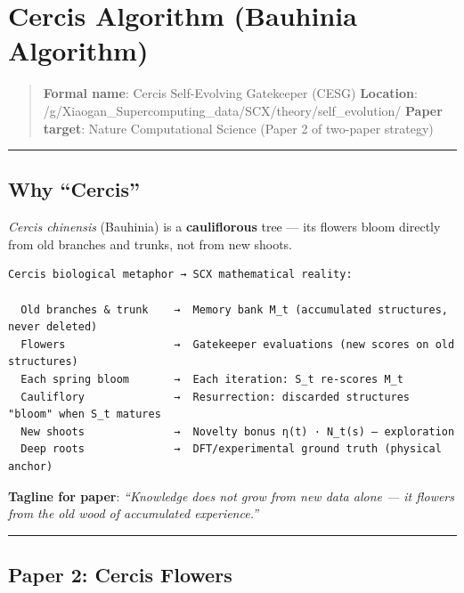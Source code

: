 \documentclass[
  12pt,
]{article}
\author{SCX}
\date{2026}
\begin{document}
\section{Cercis Algorithm (Bauhinia Algorithm)}\label{cercis-algorithm-bauhinia-algorithm}

\begin{quote}
\textbf{Formal name}: Cercis Self-Evolving Gatekeeper (CESG)
\textbf{Location}:
/g/Xiaogan\_Supercomputing\_data/SCX/theory/self\_evolution/
\textbf{Paper target}: Nature Computational Science (Paper 2 of
two-paper strategy)
\end{quote}

\begin{center}\rule{0.5\linewidth}{0.5pt}\end{center}

\subsection{Why ``Cercis''}\label{why-cercis}

\emph{Cercis chinensis} (Bauhinia) is a \textbf{cauliflorous} tree --- its
flowers bloom directly from old branches and trunks, not from new
shoots.

\begin{verbatim}
Cercis biological metaphor → SCX mathematical reality:

  Old branches & trunk    →  Memory bank M_t (accumulated structures, never deleted)
  Flowers                 →  Gatekeeper evaluations (new scores on old structures)
  Each spring bloom       →  Each iteration: S_t re-scores M_t
  Cauliflory              →  Resurrection: discarded structures "bloom" when S_t matures
  New shoots              →  Novelty bonus η(t) · N_t(s) — exploration
  Deep roots              →  DFT/experimental ground truth (physical anchor)
\end{verbatim}

\textbf{Tagline for paper}: \emph{``Knowledge does not grow from new
data alone --- it flowers from the old wood of accumulated
experience.''}

\begin{center}\rule{0.5\linewidth}{0.5pt}\end{center}

\subsection{Paper 2: Cercis Flowers}\label{paper-2-cercis-flowers}
\end{document}
